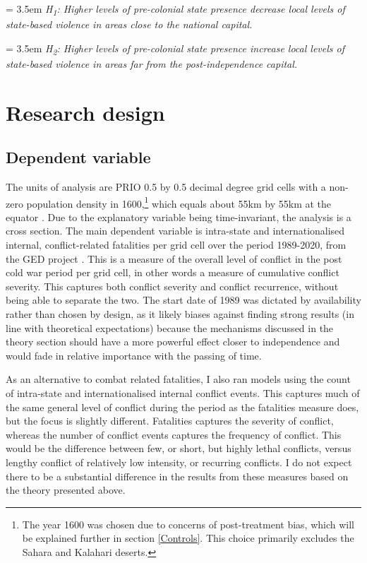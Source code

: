 \documentclass[12pt]{article}
\begin{document}
\bigskip
\hangindent = 3.5em \textit{H\textsubscript{1}: Higher levels of pre-colonial
	state presence decrease local levels of state-based violence in areas
	close to the national capital.}

\bigskip
\hangindent = 3.5em \textit{H\textsubscript{2}: Higher levels of pre-colonial
	state presence increase local levels of state-based violence in areas
	far from the post-independence capital.}

\section{Research design} \label{Research design}

\subsection{Dependent variable} \label{Dependent variable}

The units of analysis are PRIO 0.5 by 0.5 decimal degree grid cells with a
non-zero population density in 1600,\footnote{The year 1600 was chosen due to
	concerns of post-treatment bias, which will be explained further in
	section \ref{Controls}. This choice primarily excludes the Sahara and
Kalahari deserts.} which equals about 55km by 55km at the equator
\citep{Tollefsen2012}. Due to the explanatory variable being time-invariant, the
analysis is a cross section. The main dependent variable is intra-state and
internationalised internal, conflict-related fatalities per grid cell over the
period 1989-2020, from the GED project \citep{Sundberg2013}. This is a measure
of the overall level of conflict in the post cold war period per grid cell, in
other words a measure of cumulative conflict severity. This captures both
conflict severity and conflict recurrence, without being able to separate the
two. The start date of 1989 was dictated by availability rather than chosen by
design, as it likely biases against finding strong results (in line with
theoretical expectations) because the mechanisms discussed in the theory
section should have a more powerful effect closer to independence and would fade
in relative importance with the passing of time.

As an alternative to combat related fatalities, I also ran models using the
count of intra-state and internationalised internal conflict events. This
captures much of the same general level of conflict during the period as the
fatalities measure does, but the focus is slightly different. Fatalities
captures the severity of conflict, whereas the number of conflict events
captures the frequency of conflict. This would be the difference between few, or
short, but highly lethal conflicts, versus lengthy conflict of relatively low
intensity, or recurring conflicts. I do not expect there to be a substantial
difference in the results from these measures based on the theory presented
above.
\end{document}
